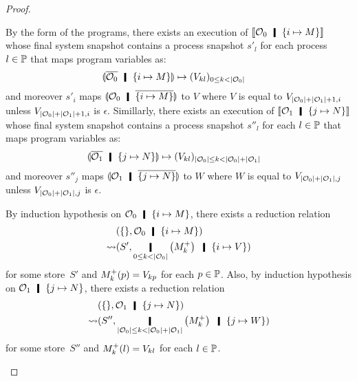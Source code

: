 \begin{proof}
\begin{description}
	  By the form of the programs,
	  there exists an execution of $\semo{\hypert_0\hmid
	  \imapsto{M}}$
	  whose final system snapshot contains a process snapshot
	  $s'_l$ for each process~$l\in \mathbb{P}$
	  that maps program variables as:
	  \begin{align*}
	   \semoi{\overline{\hypert_0}\hmid \imapsto{M}}&\mapsto
	   (V_{kl})_{0\le k < |\hypert_0|}
	  \end{align*}
	  and moreover $s'_i$ maps $\semoi{\hypert_0\hmid
	  \overline{\imapsto{M}}}$ to $V$ where $V$ is equal to
	  $V_{|\mathcal{O}_0|+|\mathcal{O}_1|+1,i}$ unless
	  $V_{|\mathcal{O}_0|+|\mathcal{O}_1|+1,i}$ is $\epsilon$.
	  Simillarly,
	  there exists an execution of $\semo{\hypert_1\hmid
	  \jmapsto{N}}$
	  whose final system snapshot contains a process snapshot
	  $s''_l$ for each $l\in\mathbb{P}$
	  that maps program variables as:
	  \begin{align*}
	   \semoi{\overline{\hypert_1}\hmid \jmapsto{N}}&\mapsto
	   (V_{kl})_{|\hypert_0|\le k < |\hypert_0| + |\hypert_1|}
	  \end{align*}
	  and moreover $s''_j$ maps $\semoi{\hypert_1\hmid
	  \overline{\jmapsto{N}}}$ to $W$ where $W$ is
	  equal to $V_{|\mathcal{O}_0|+|\mathcal{O}_1|,j}$ unless
	  $V_{|\mathcal{O}_0|+|\mathcal{O}_1|,j}$ is $\epsilon$.

	  By induction hypothesis on $\hypert_0\hmid \imapsto{M}$,
	  there exists a reduction relation
	  \begin{align*}
	   &\concreteconf{\{\}}{ \hypert_0\hmid \imapsto{M} } \\
	   \reduce&
	   \concreteconf{S'}{\operatorname*{\hmid}_{0\le k<|\hypert_0|}
	   \left(\m{M}_k\right)
	   \hmid \{i\mapsto {V}\}}
	  \end{align*}
	  for some store~$S'$ and ${M}^+_k(p) = V_{kp}$ for each $p\in
	  \mathbb{P}$.
	  Also,
	  by induction hypothesis on $\hypert_1\hmid \jmapsto{N}$,
	  there exists a reduction relation
	  \begin{align*}
	   &\concreteconf{\{\}}{ \hypert_1\hmid \jmapsto{N} } \\
	   \reduce&
	   \concreteconf{S''}{\operatorname*{\hmid}_{|\hypert_0|\le
	   k<|\hypert_0| + |\hypert_1|}
	   \left(\m{M}_k\right)
	   \hmid \{j\mapsto {W}\}}
	  \end{align*}
	  for some store~$S''$ and ${M}^+_k(l) = V_{kl}$ for each $l\in
	  \mathbb{P}$.


\end{description}
\end{proof}
